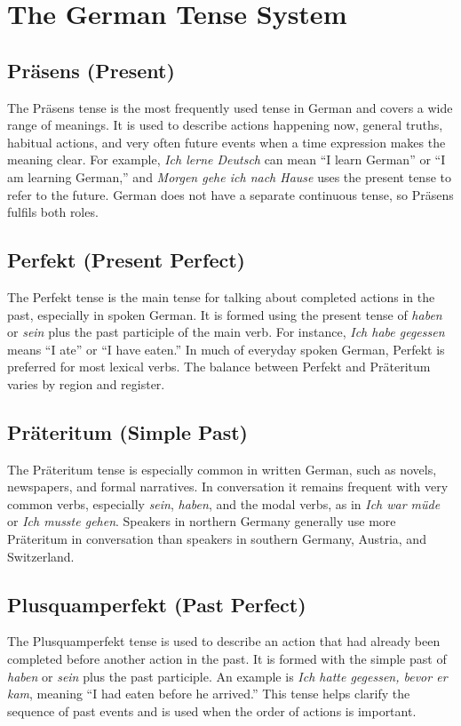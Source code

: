 \chapter{The German Tense System}

\section{Präsens (Present)}
The Präsens tense is the most frequently used tense in German and covers a wide range of meanings. It is used to describe actions happening now, general truths, habitual actions, and very often future events when a time expression makes the meaning clear. For example, \textit{Ich lerne Deutsch} can mean “I learn German” or “I am learning German,” and \textit{Morgen gehe ich nach Hause} uses the present tense to refer to the future. German does not have a separate continuous tense, so Präsens fulfils both roles.

\section{Perfekt (Present Perfect)}
The Perfekt tense is the main tense for talking about completed actions in the
past, especially in spoken German. It is formed using the present tense of
\textit{haben} or \textit{sein} plus the past participle of the main verb. For
instance, \textit{Ich habe gegessen} means “I ate” or “I have eaten.” In much
of everyday spoken German, Perfekt is preferred for most lexical verbs. The
balance between Perfekt and Präteritum varies by region and register.

\section{Präteritum (Simple Past)}
The Präteritum tense is especially common in written German, such as novels,
newspapers, and formal narratives. In conversation it remains frequent with
very common verbs, especially \textit{sein}, \textit{haben}, and the modal
verbs, as in \textit{Ich war müde} or \textit{Ich musste gehen}. Speakers in
northern Germany generally use more Präteritum in conversation than speakers
in southern Germany, Austria, and Switzerland.

\section{Plusquamperfekt (Past Perfect)}
The Plusquamperfekt tense is used to describe an action that had already been completed before another action in the past. It is formed with the simple past of \textit{haben} or \textit{sein} plus the past participle. An example is \textit{Ich hatte gegessen, bevor er kam}, meaning “I had eaten before he arrived.” This tense helps clarify the sequence of past events and is used when the order of actions is important.

